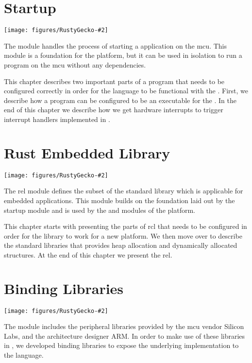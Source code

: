 
\newcommand{\corechapter}[3]{
  \chapter{#1}
  \label{chap:#2}
  \begin{center}
    \texttt{[image: figures/RustyGecko-\#2]}
  \end{center}
  \hfill \break
  \hfill \break
  \hfill \break
#3
}

\corechapter{Startup}{startup}{%
The  module handles the process of starting a {\rust} application on the \glsdesc{mcu}.
This module is a foundation for the {\rg} platform, but it can be used in isolation to run a program on the \gls{mcu} without any dependencies.

This chapter describes two important parts of a {\rust} program that needs to be configured correctly in order for the language to be functional with the {\gecko}.
First, we describe how a {\rust} program can be configured to be an executable for the {\gecko}.
In the end of this chapter we describe how we get hardware interrupts to trigger interrupt handlers implemented in {\rust}.
}


\corechapter{Rust Embedded Library}{rel}{%
The \glsdesc{rel} module defines the subset of the standard {\rust} library which is applicable for embedded applications.
This module builds on the foundation laid out by the startup module and is used by the \lib{bindings} and \lib{Application Layer} modules of the {\rg} platform.

This chapter starts with presenting the parts of \gls{rcl} that needs to be configured in order for the library to work for a new platform.
We then move over to describe the standard {\rust} libraries that provides heap allocation and dynamically allocated structures.
At the end of this chapter we present the \gls{rel}.
}



\corechapter{Binding Libraries}{bindings}{%
The  module includes the peripheral libraries provided by the \gls{mcu} vendor Silicon Labs, and the architecture designer ARM.
In order to make use of these libraries in {\rust}, we developed binding libraries to expose the underlying {\C} implementation to the {\rust} language.
}




